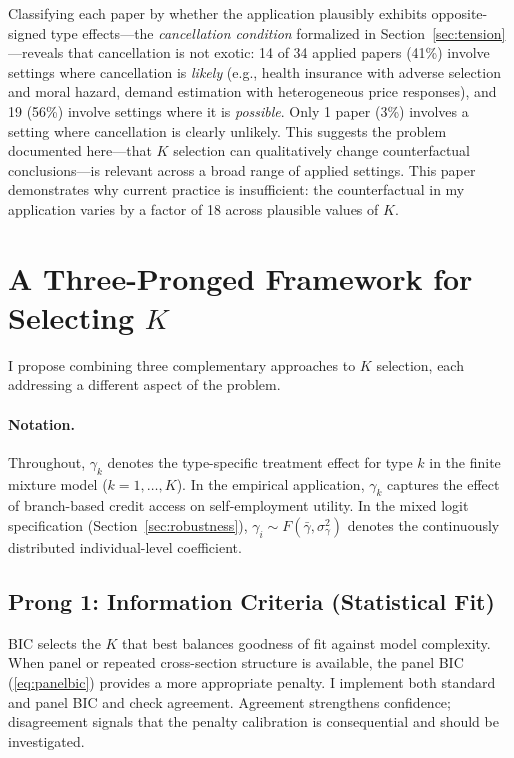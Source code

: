 \documentclass[12pt]{article}
\begin{document}
Classifying each paper by whether the application plausibly exhibits opposite-signed type effects---the \textit{cancellation condition} formalized in Section~\ref{sec:tension}---reveals that cancellation is not exotic: 14 of 34 applied papers (41\%) involve settings where cancellation is \textit{likely} (e.g., health insurance with adverse selection and moral hazard, demand estimation with heterogeneous price responses), and 19 (56\%) involve settings where it is \textit{possible}. Only 1 paper (3\%) involves a setting where cancellation is clearly unlikely. This suggests the problem documented here---that $K$ selection can qualitatively change counterfactual conclusions---is relevant across a broad range of applied settings. This paper demonstrates why current practice is insufficient: the counterfactual in my application varies by a factor of 18 across plausible values of $K$.


\section{A Three-Pronged Framework for Selecting $K$}
\label{sec:framework}

I propose combining three complementary approaches to $K$ selection, each addressing a different aspect of the problem.

\paragraph{Notation.} Throughout, $\gamma_k$ denotes the type-specific treatment effect for type $k$ in the finite mixture model ($k = 1, \ldots, K$). In the empirical application, $\gamma_k$ captures the effect of branch-based credit access on self-employment utility. In the mixed logit specification (Section~\ref{sec:robustness}), $\gamma_i \sim F(\bar{\gamma}, \sigma^2_\gamma)$ denotes the continuously distributed individual-level coefficient.

\subsection{Prong 1: Information Criteria (Statistical Fit)}

BIC selects the $K$ that best balances goodness of fit against model complexity. When panel or repeated cross-section structure is available, the \citet{hao2025} panel BIC (\ref{eq:panelbic}) provides a more appropriate penalty. I implement both standard and panel BIC and check agreement. Agreement strengthens confidence; disagreement signals that the penalty calibration is consequential and should be investigated.
\end{document}
